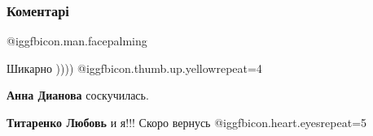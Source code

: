  
 
 
 
 
\subsubsection{Коментарі}
\label{sec:08_09_2021.fb.titarenko_lubov.1.ukraina_kreml_agenty.cmt}

\begin{itemize}
 
 @igg{fbicon.man.facepalming} 

 
Шикарно )))) @igg{fbicon.thumb.up.yellow}{repeat=4} 

\begin{itemize}
 
\textbf{Анна Дианова} соскучилась.

 
\textbf{Титаренко Любовь} и я!!! Скоро вернусь  @igg{fbicon.heart.eyes}{repeat=5} 

 

\end{itemize}
\end{itemize}
